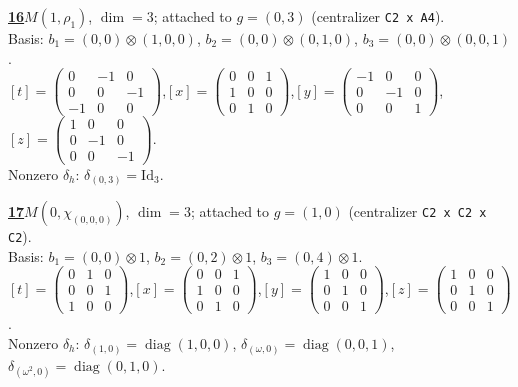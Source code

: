 \begin{samepage}\noindent\textbf{\underline{16}}\quad $M(1,\rho_{1})$, $\dim=3$; attached to $g=(0,3)$ (centralizer \texttt{C2 x A4}).\\
Basis: $b_{1}=(0,0)\otimes (1,0,0)$, $b_{2}=(0,0)\otimes (0,1,0)$, $b_{3}=(0,0)\otimes (0,0,1)$.\\
$[t]=\left(\begin{smallmatrix} 0 & -1 & 0 \\ 0 & 0 & -1 \\ -1 & 0 & 0 \end{smallmatrix}\right)$,\quad $[x]=\left(\begin{smallmatrix} 0 & 0 & 1 \\ 1 & 0 & 0 \\ 0 & 1 & 0 \end{smallmatrix}\right)$,\quad $[y]=\left(\begin{smallmatrix} -1 & 0 & 0 \\ 0 & -1 & 0 \\ 0 & 0 & 1 \end{smallmatrix}\right)$,\quad $[z]=\left(\begin{smallmatrix} 1 & 0 & 0 \\ 0 & -1 & 0 \\ 0 & 0 & -1 \end{smallmatrix}\right)$.\\
Nonzero $\delta_h$: $\delta_{(0,3)}=\mathrm{Id}_{3}$.\end{samepage}
\medskip

\begin{samepage}\noindent\textbf{\underline{17}}\quad $M(0,\chi_{(0,0,0)})$, $\dim=3$; attached to $g=(1,0)$ (centralizer \texttt{C2 x C2 x C2}).\\
Basis: $b_{1}=(0,0)\otimes 1$, $b_{2}=(0,2)\otimes 1$, $b_{3}=(0,4)\otimes 1$.\\
$[t]=\left(\begin{smallmatrix} 0 & 1 & 0 \\ 0 & 0 & 1 \\ 1 & 0 & 0 \end{smallmatrix}\right)$,\quad $[x]=\left(\begin{smallmatrix} 0 & 0 & 1 \\ 1 & 0 & 0 \\ 0 & 1 & 0 \end{smallmatrix}\right)$,\quad $[y]=\left(\begin{smallmatrix} 1 & 0 & 0 \\ 0 & 1 & 0 \\ 0 & 0 & 1 \end{smallmatrix}\right)$,\quad $[z]=\left(\begin{smallmatrix} 1 & 0 & 0 \\ 0 & 1 & 0 \\ 0 & 0 & 1 \end{smallmatrix}\right)$.\\
Nonzero $\delta_h$: $\delta_{(1,0)}=\operatorname{diag}(1,0,0)$, $\delta_{(\omega,0)}=\operatorname{diag}(0,0,1)$, $\delta_{(\omega^2,0)}=\operatorname{diag}(0,1,0)$.\end{samepage}
\medskip

